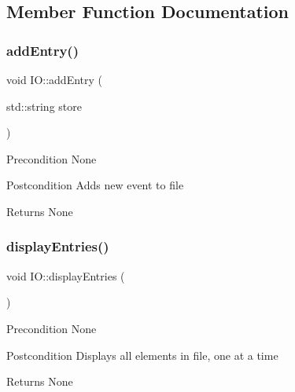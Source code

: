 \subsection{Member Function Documentation}
\mbox{\label{class_i_o_aa3537c0737038acdc6c2963138bfabdf}} 
\subsubsection{\texorpdfstring{add\+Entry()}{addEntry()}}
{\footnotesize\ttfamily void I\+O\+::add\+Entry (\begin{DoxyParamCaption}\item[{std\+::string}]{store }\end{DoxyParamCaption})}

\begin{DoxyPrecond}{Precondition}
None 
\end{DoxyPrecond}
\begin{DoxyPostcond}{Postcondition}
Adds new event to file 
\end{DoxyPostcond}
\begin{DoxyReturn}{Returns}
None 
\end{DoxyReturn}
\mbox{\label{class_i_o_a48e9febfbb2c6c3e01b467fd030c2529}} 
\subsubsection{\texorpdfstring{display\+Entries()}{displayEntries()}}
{\footnotesize\ttfamily void I\+O\+::display\+Entries (\begin{DoxyParamCaption}{ }\end{DoxyParamCaption})}

\begin{DoxyPrecond}{Precondition}
None 
\end{DoxyPrecond}
\begin{DoxyPostcond}{Postcondition}
Displays all elements in file, one at a time 
\end{DoxyPostcond}
\begin{DoxyReturn}{Returns}
None 
\end{DoxyReturn}
\mbox{\label{class_i_o_a3829dc8ad91e1f2d560be799b6d9b04d}} 
